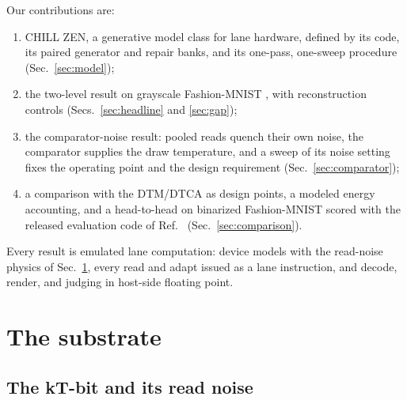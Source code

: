 \documentclass[reprint,amsmath,amssymb,aps,nofootinbib]{revtex4-2}
\begin{document}
Our contributions are:
\begin{enumerate}
\item CHILL ZEN, a generative model class for lane hardware, defined
  by its code, its paired generator and repair banks, and its
  one-pass, one-sweep procedure (Sec.~\ref{sec:model});
\item the two-level result on grayscale Fashion-MNIST
  \cite{xiao2017fashion}, with reconstruction controls (Secs.~\ref{sec:headline} and
  \ref{sec:gap});
\item the comparator-noise result: pooled reads quench their own
  noise, the comparator supplies the draw temperature, and a sweep of
  its noise setting fixes the operating point and the design
  requirement (Sec.~\ref{sec:comparator});
\item a comparison with the DTM/DTCA as design points, a modeled
  energy accounting, and a head-to-head on binarized Fashion-MNIST
  scored with the released evaluation code of
  Ref.~\cite{jelincic2025dtm} (Sec.~\ref{sec:comparison}).
\end{enumerate}
Every result is emulated lane computation: device models with the
read-noise physics of Sec.~\ref{sec:substrate}, every read and adapt
issued as a lane instruction, and decode, render, and judging in
host-side floating point.

\section{The substrate}\label{sec:substrate}

\subsection{The kT-bit and its read noise}\label{sec:ktbit}
\end{document}
